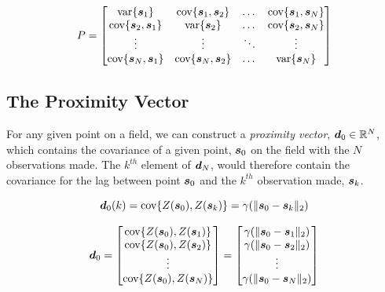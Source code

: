 \begin{equation}
    P = \begin{bmatrix} 

    \text{var}\{{\it{\boldsymbol{s}}}_1\} & \text{cov}\{{\it{\boldsymbol{s}}}_1, {\it{\boldsymbol{s}}}_2\} & \dots & \text{cov}\{{\it{\boldsymbol{s}}}_1, {\it{\boldsymbol{s}}}_N\} \\
    
    \text{cov}\{{\it{\boldsymbol{s}}}_2, {\it{\boldsymbol{s}}}_1\} & \text{var}\{{\it{\boldsymbol{s}}}_2\} & \dots & \text{cov}\{{\it{\boldsymbol{s}}}_2, {\it{\boldsymbol{s}}}_N\} \\

    \vdots & \vdots & \ddots & \vdots  \\
    
    \text{cov}\{{\it{\boldsymbol{s}}}_N, {\it{\boldsymbol{s}}}_1\} & \text{cov}\{{\it{\boldsymbol{s}}}_N, {\it{\boldsymbol{s}}}_2\} & \dots & \text{var}\{{\it{\boldsymbol{s}}}_N\} \\

    \end{bmatrix}
    \label{eq:covvarmat}
\end{equation}

\subsection{The Proximity Vector}
For any given point on a field, we can construct a \textit{proximity vector}, ${\it{\boldsymbol{d}}}_0 \in \mathbb{R}^N$, which contains the covariance of a given point, ${\it{\boldsymbol{s}}}_0$ on the field with the $N$ observations made. The $k^{th}$ element of ${\it{\boldsymbol{d}}}_N$, would therefore contain the covariance for the lag between point ${\it{\boldsymbol{s}}}_0$ and the $k^{th}$ observation made, ${\it{\boldsymbol{s}}}_k$.

$${\it{\boldsymbol{d}}}_0(k) = \text{cov}\{Z({\it{\boldsymbol{s}}}_0), Z({\it{\boldsymbol{s}}}_k)\} = \gamma(\| {\it{\boldsymbol{s}}}_0 - {\it{\boldsymbol{s}}}_k \|_2)$$

\begin{equation}
    {\it{\boldsymbol{d}}}_0 = \begin{bmatrix} 
                    \text{cov}\{Z({\it{\boldsymbol{s}}}_0), Z({\it{\boldsymbol{s}}}_1)\} \\
                    \text{cov}\{Z({\it{\boldsymbol{s}}}_0), Z({\it{\boldsymbol{s}}}_2)\} \\
                     \vdots \\
                    \text{cov}\{Z({\it{\boldsymbol{s}}}_0), Z({\it{\boldsymbol{s}}}_N)\} \\
        \end{bmatrix} = 
        \begin{bmatrix} 
                    \gamma(\| {\it{\boldsymbol{s}}}_0 - {\it{\boldsymbol{s}}}_1 \|_2) \\
                    \gamma(\| {\it{\boldsymbol{s}}}_0 - {\it{\boldsymbol{s}}}_2 \|_2) \\
                     \vdots \\
                    \gamma(\| {\it{\boldsymbol{s}}}_0 - {\it{\boldsymbol{s}}}_N \|_2) \\
        \end{bmatrix} 
    \label{eq:proxvect}
\end{equation}


